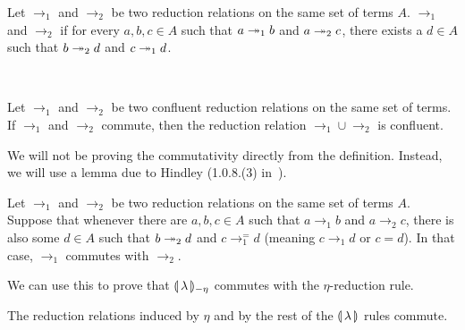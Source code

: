 \begin{definition}
  Let $\to_1$ and $\to_2$ be two reduction relations on the same set of
  terms $A$. $\to_1$ and $\to_2$  if for every $a,b,c \in A$
  such that $a \twoheadrightarrow_1 b$ and $a \twoheadrightarrow_2 c$, there exists a $d \in A$ such
  that $b \twoheadrightarrow_2 d$ and $c \twoheadrightarrow_1 d$.
\end{definition}

\begin{lemma}\label{lem:hindley-rosen}
  ~\cite{klop1992term}
  
  Let $\to_1$ and $\to_2$ be two confluent reduction relations on the same
  set of terms. If $\to_1$ and $\to_2$ commute, then the reduction relation
  $\to_1 \cup \to_2$ is confluent.
\end{lemma}

We will not be proving the commutativity directly from the
definition. Instead, we will use a lemma due to Hindley (1.0.8.(3)
in~\cite{klop1992term}).

\begin{lemma}\label{lem:commutativity}
  Let $\to_1$ and $\to_2$ be two reduction relations on the same set of
  terms $A$. Suppose that whenever there are $a,b,c \in A$ such that
  $a \to_1 b$ and $a \to_2 c$, there is also some $d \in A$ such that
  $b \twoheadrightarrow_2 d$ and $c \to_1^= d$ (meaning $c \to_1 d$ or $c = d$). In that
  case, $\to_1$ commutes with $\to_2$.~\cite{klop1992term}
\end{lemma}

We can use this to prove that $\llparenthesis \, \lambda \, \rrparenthesis_{-\eta}$ commutes with the
$\eta$-reduction rule.

\begin{lemma}\label{lem:eta-commutes}

  The reduction relations induced by $\eta$ and by the rest of the
  $\llparenthesis \, \lambda \, \rrparenthesis$ rules commute.
\end{lemma}

